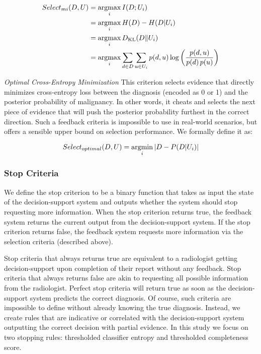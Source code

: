 \begin{align*}
Select_{mi}(D, U) &= \operatorname*{argmax}_{i} I(D; U_i) \\
&= \operatorname*{argmax}_{i} H(D)-H(D|U_i) \\
&= \operatorname*{argmax}_{i} D_{\mathrm{KL}}(D\|U_i) \\
&= \operatorname*{argmax}_{i} \sum_{d \in D} \sum_{u \in U_i} p(d,u) \log{ \left(\frac{p(d,u)}{p(d)\,p(u)}\right)}
\end{align*}




\emph{Optimal Cross-Entropy Minimization}
This criterion selects evidence that directly minimizes cross-entropy loss between the diagnosis (encoded as 0 or 1) and the posterior probability of malignancy.
In other words, it cheats and selects the next piece of evidence that will push the posterior probability furthest in the correct direction.
Such a feedback criteria is impossible to use in real-world scenarios, but offers a sensible upper bound on selection performance.
We formally define it as:

\begin{equation}
Select_{optimal}(D, U) = \operatorname*{argmin}_{i} \left|D-P(D | U_i)\right|
\end{equation}



\subsubsection{Stop Criteria}
We define the stop criterion to be a binary function that takes as input the state of the decision-support system and outputs whether the system should stop requesting more information.
When the stop criterion returns true, the feedback system returns the current output from the decision-support system.
If the stop criterion returns false, the feedback system requests more information via the selection criteria (described above).

Stop criteria that always returns true are equivalent to a radiologist getting decision-support upon completion of their report without any feedback.
Stop criteria that always returns false are akin to requesting all possible information from the radiologist.
Perfect stop criteria will return true as soon as the decision-support system predicts the correct diagnosis.
Of course, such criteria are impossible to define without already knowing the true diagnosis.
Instead, we create rules that are indicative or correlated with the decision-support system outputting the correct decision with partial evidence.
In this study we focus on two stopping rules: thresholded classifier entropy and thresholded completeness score.


